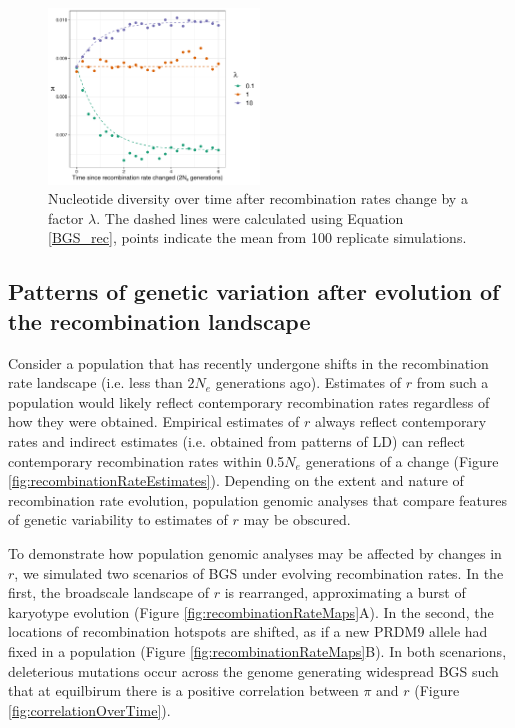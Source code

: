 \documentclass[11pt,twoside, onecolumn]{GSA_format}
\begin{document}
\begin{figure}[H]
\includegraphics[width=0.5\textwidth]{../TheoreticalExpectation/B_over_time_fixed_s_plot_singlePanel}
\caption{Nucleotide diversity over time after recombination rates change by a factor $\lambda$. The dashed lines were calculated using Equation \ref{BGS_rec}, points indicate the mean from 100 replicate simulations.}
\label{fig:BGS_over_time_fixed_s}
\end{figure}

\subsection{Patterns of genetic variation after evolution of the recombination landscape}


Consider a population that has recently undergone shifts in the recombination rate landscape (i.e. less than $2N_e$ generations ago). Estimates of $r$ from such a population would likely reflect contemporary recombination rates regardless of how they were obtained. Empirical estimates of $r$ always reflect contemporary rates and indirect estimates (i.e. obtained from patterns of LD) can reflect contemporary recombination rates within 0.5$N_e$ generations of a change (Figure \ref{fig:recombinationRateEstimates}). Depending on the extent and nature of recombination rate evolution, population genomic analyses that compare features of genetic variability to estimates of $r$ may be obscured. 

\vspace{5px}

To demonstrate how population genomic analyses may be affected by changes in $r$, we simulated two scenarios of BGS under evolving recombination rates. In the first, the broadscale landscape of $r$ is rearranged, approximating a burst of karyotype evolution (Figure \ref{fig:recombinationRateMaps}A). In the second, the locations of recombination hotspots are shifted, as if a new PRDM9 allele had fixed in a population (Figure \ref{fig:recombinationRateMaps}B). In both scenarions, deleterious mutations occur across the genome generating widespread BGS such that at equilbirum there is a positive correlation between $\pi$ and $r$ (Figure \ref{fig:correlationOverTime}).
\end{document}

